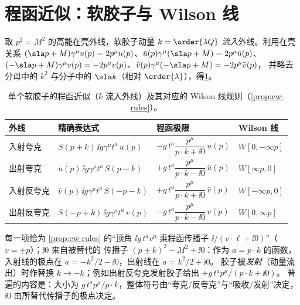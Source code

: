 \section{程函近似：软胶子与 Wilson 线}\label{sec:cw-eikonal}

取 $p^2=M^2$ 的高能在壳外线，软胶子动量 $k=\order{\lambda Q}$ \emph{流入}外线。利用在壳关系
$(\sla p+M)\gamma^\mu u(p)=2p^\mu u(p)$、$\bar u(p)\gamma^\mu(\sla p+M)=2p^\mu\bar u(p)$、
$(-\sla p+M)\gamma^\mu v(p)=-2p^\mu v(p)$、$\bar v(p)\gamma^\mu(-\sla p+M)=-2p^\mu\bar v(p)$，
并略去分母中的 $k^2$ 与分子中的 $\sla k$（相对 $\order{\lambda}$），得\cref{tab:cw-eikonal}。

\begin{table}[htbp]
\centering
\caption{单个软胶子的程函近似（$k$ 流入外线）及其对应的 Wilson 线规则（\cref{prop:cw-rules}）。}\label{tab:cw-eikonal}
\renewcommand{\arraystretch}{1.6}
\begin{tabular}{@{}llll@{}}
\toprule
外线 & 精确表达式 & 程函极限 & Wilson 线 \\
\midrule
入射夸克 & $S(p+k)\,\ii g\gamma^\mu t^a\,u(p)$ & $-g\,t^a\dfrac{p^\mu}{p\cdot k+\ii0}\,u(p)$ & $W[0,-\infty p]$ \\
出射夸克 & $\bar u(p)\,\ii g\gamma^\mu t^a\,S(p-k)$ & $+g\,t^a\dfrac{p^\mu}{p\cdot k-\ii0}\,\bar u(p)$ & $W[\infty p,0]$ \\
入射反夸克 & $\bar v(p)\,\ii g\gamma^\mu t^a\,S(-p-k)$ & $+g\,t^a\dfrac{p^\mu}{p\cdot k+\ii0}\,\bar v(p)$ & $W[-\infty p,0]$ \\
出射反夸克 & $S(-p+k)\,\ii g\gamma^\mu t^a\,v(p)$ & $-g\,t^a\dfrac{p^\mu}{p\cdot k-\ii0}\,v(p)$ & $W[0,\infty p]$ \\
\bottomrule
\end{tabular}
\end{table}

每一项恰为 \cref{prop:cw-rules} 的“顶角 $\ii g\,t^av^\mu$ 乘程函传播子 $\ii/(v\cdot\ell+\ii0)$”（$v=\pm p$）；$\ii0$ 来自被替代的
传播子 $(p\pm k)^2-M^2+\ii0$：作为 $a=p\cdot k$ 的函数，入射线的极点在 $a=-k^2/2-\ii0$，出射线在 $a=k^2/2+\ii0$。
胶子被\emph{发射}（动量流出）时作替换 $k\to-k$；例如出射反夸克发射胶子给出 $+g\,t^ap^\mu/(p\cdot k+\ii0)$。
普遍的内容是：大小为 $g\,t^ap^\mu/p\cdot k$，整体符号由“夸克/反夸克”与“吸收/发射”决定，$\ii0$ 由所替代传播子的极点决定。

